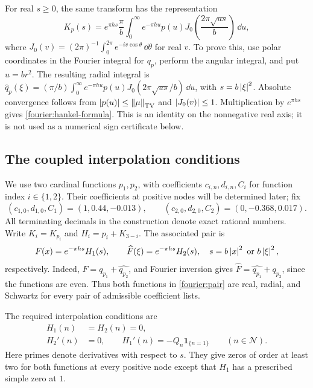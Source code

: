 \begin{remark}\label{fourier:hankel}
For real \(s\ge0\), the same transform has the representation
\begin{equation}\label{fourier:hankel-formula}
 K_p(s)=e^{\pi hs}\frac{\pi}{b}\int_0^\infty
       e^{-\pi hu}p(u)
       J_0\!\left(\frac{2\pi\sqrt{us}}{b}\right)\,\dd u,
\end{equation}
where
\(J_0(v)=(2\pi)^{-1}\int_0^{2\pi}e^{-iv\cos\theta}\,\dd\theta\)
for real \(v\).  To prove this, use polar coordinates in the Fourier
integral for \(q_p\), perform the angular integral, and put \(u=b r^2\).
The resulting radial integral is
\(\widehat q_p(\xi)=(\pi/b)\int_0^\infty e^{-\pi hu}p(u)
J_0(2\pi\sqrt{us}/b)\,\dd u\), with \(s=b\left\lvert\xi\right\rvert^2\).
Absolute convergence follows from \(\left\lvert p(u)\right\rvert\le\left\lVert\mu\right\rVert_{\mathrm{TV}}\)
and \(\left\lvert J_0(v)\right\rvert\le1\).  Multiplication by \(e^{\pi hs}\) gives
\eqref{fourier:hankel-formula}.  This is an identity on the nonnegative real
axis; it is not used as a numerical sign certificate below.
\end{remark}

\subsection{The coupled interpolation conditions}

We use two cardinal functions \(p_1,p_2\), with coefficients
\(c_{i,n},d_{i,n},C_i\) for function index \(i\in\{1,2\}\).  Their
coefficients at positive nodes will be determined later; fix
\begin{equation}\label{fourier:fixed}
 (c_{1,0},d_{1,0},C_1)=(1,0.44,-0.013),\qquad
 (c_{2,0},d_{2,0},C_2)=(0,-0.368,0.017).
\end{equation}
All terminating decimals in the construction denote exact rational numbers.
Write \(K_i=K_{p_i}\) and \(H_i=p_i+K_{3-i}\).  The associated pair is
\begin{equation}\label{fourier:pair}
 F(x)=e^{-\pi hs}H_1(s),\qquad
 \widehat F(\xi)=e^{-\pi hs}H_2(s),
 \quad s=b\left\lvert x\right\rvert^2\ \text{or}\ b\left\lvert\xi\right\rvert^2,
\end{equation}
respectively.  Indeed, \(F=q_{p_1}+\widehat{q_{p_2}}\), and Fourier
inversion gives \(\widehat F=\widehat{q_{p_1}}+q_{p_2}\), since the
functions are even.  Thus both functions in \eqref{fourier:pair} are real,
radial, and Schwartz for every pair of admissible coefficient lists.

The required interpolation conditions are
\begin{equation}\label{fourier:interpolation}
 \begin{split}
 H_1(n)&=H_2(n)=0,\\
 H_2'(n)&=0,\qquad H_1'(n)=-Q_n\mathbf1_{\{n=1\}}
 \qquad(n\in\mathcal N).
 \end{split}
\end{equation}
Here primes denote derivatives with respect to \(s\).
They give zeros of order at least two for both functions at every positive
node except that \(H_1\) has a prescribed simple zero at \(1\).


